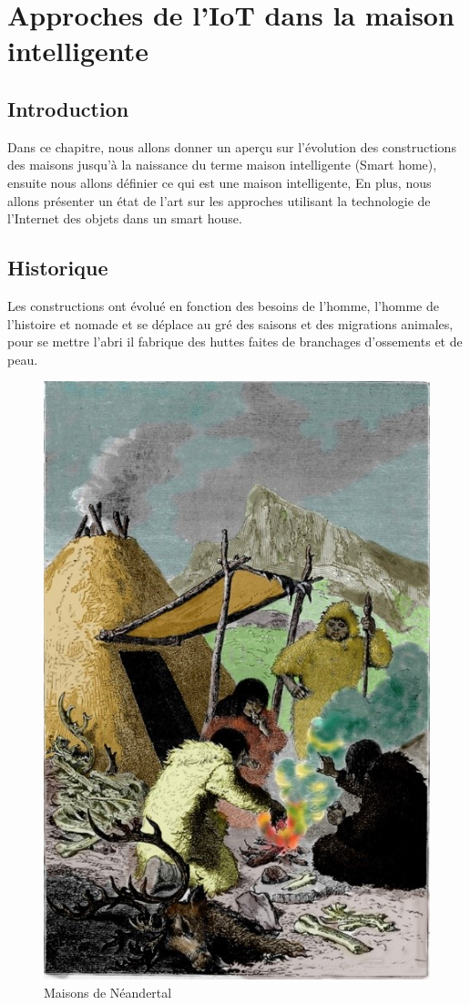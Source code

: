 
\chapter{Approches de l’IoT dans la maison intelligente}
\section{Introduction}
Dans ce chapitre, nous allons donner un aperçu sur l’évolution des constructions des maisons jusqu’à la naissance du terme maison intelligente (Smart home), ensuite nous allons définier  ce qui est une maison intelligente, En plus, nous allons présenter un état de l’art sur les approches utilisant la technologie de l’Internet des objets dans un smart house.
\section{Historique}
Les constructions ont évolué en fonction des besoins de l’homme, l'homme de l'histoire et nomade et se déplace au gré des saisons et des migrations animales, pour se mettre l'abri il fabrique des huttes faites de branchages d'ossements et de peau. 
\begin{figure}[H]
    \centering
    \includegraphics[scale=1]{chap1/chap31.jpg}
    \caption{Maisons de Néandertal}
    \label{chap31}
\end{figure}


